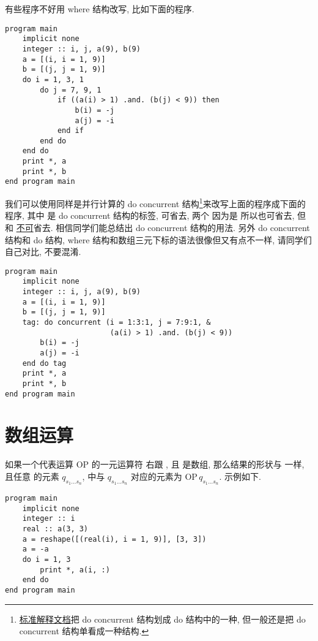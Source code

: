 有些程序不好用 where 结构改写, 比如下面的程序.
\begin{lstlisting}
program main
    implicit none
    integer :: i, j, a(9), b(9)
    a = [(i, i = 1, 9)]
    b = [(j, j = 1, 9)]
    do i = 1, 3, 1
        do j = 7, 9, 1
            if ((a(i) > 1) .and. (b(j) < 9)) then
                b(i) = -j
                a(j) = -i
            end if
        end do
    end do
    print *, a
    print *, b
end program main
\end{lstlisting}
我们可以使用同样是并行计算的 do concurrent 结构\footnote{\href{https://j3-fortran.org/doc/year/24/24-007.pdf}{标准解释文档}把 do concurrent 结构划成 do 结构中的一种, 但一般还是把 do concurrent 结构单看成一种结构.}来改写上面的程序成下面的程序, 其中  是 do concurrent 结构的标签, 可省去, 两个  因为是  所以也可省去, 但  和  \uline{不可}省去. 相信同学们能总结出 do concurrent 结构的用法. 另外 do concurrent 结构和 do 结构, where 结构和数组三元下标的语法很像但又有点不一样, 请同学们自己对比, 不要混淆.
\begin{lstlisting}
program main
    implicit none
    integer :: i, j, a(9), b(9)
    a = [(i, i = 1, 9)]
    b = [(j, j = 1, 9)]
    tag: do concurrent (i = 1:3:1, j = 7:9:1, &
                        (a(i) > 1) .and. (b(j) < 9))
        b(i) = -j
        a(j) = -i
    end do tag
    print *, a
    print *, b
end program main
\end{lstlisting}

\section{数组运算}\label{fortran_array_operation}

如果一个代表运算 $\text{OP}$ 的一元运算符  右跟 , 且  是数组, 那么结果的形状与  一样, 且任意  的元素 $q_{s_1\dots s_n}$,  中与 $q_{s_1\dots s_n}$ 对应的元素为 $\text{OP}\,q_{s_1\dots s_n}$. 示例如下.
\begin{lstlisting}
program main
    implicit none
    integer :: i
    real :: a(3, 3)
    a = reshape([(real(i), i = 1, 9)], [3, 3])
    a = -a
    do i = 1, 3
        print *, a(i, :)
    end do
end program main
\end{lstlisting}


